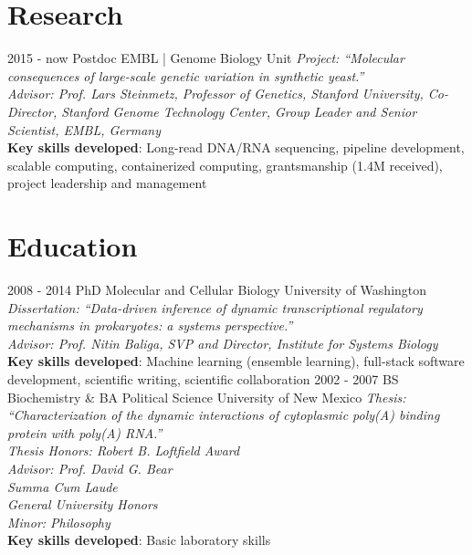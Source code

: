 \documentclass[usenames,dvipsnames]{friggeri-cv}
\begin{document}
\section{Research}
\begin{entrylist}
  \entry
    {2015 - now}
    {Postdoc}
    {EMBL | Genome Biology Unit}
    {\emph{Project: ``Molecular consequences of large-scale genetic variation in synthetic yeast.''}\\
    \emph{Advisor: Prof. Lars Steinmetz, Professor of Genetics, Stanford University, Co-Director, Stanford Genome Technology Center, Group Leader and Senior Scientist, EMBL, Germany}\\
    \textbf{Key skills developed}: Long-read DNA/RNA sequencing, pipeline development, scalable computing, containerized computing, grantsmanship (1.4M received), project leadership and management}
\end{entrylist}

\section{Education}
\begin{entrylist}
  \entry
    {2008 - 2014}
    {PhD Molecular and Cellular Biology}
    {University of Washington}
    {\emph{Dissertation: ``Data-driven inference of dynamic transcriptional regulatory mechanisms in prokaryotes: a systems perspective.''}\\
    \emph{Advisor: Prof. Nitin Baliga, SVP and Director, Institute for Systems Biology}\\
    \textbf{Key skills developed}: Machine learning (ensemble learning), full-stack software development, scientific writing, scientific collaboration}
  \entry
    {2002 - 2007}
    {BS Biochemistry \& BA Political Science}
    {University of New Mexico}
    {\emph{Thesis: ``Characterization of the dynamic interactions of cytoplasmic poly(A) binding protein with poly(A) RNA.''}\\
    \textit{Thesis Honors: Robert B. Loftfield Award}\\
    \emph{Advisor: Prof. David G. Bear}\\
    \textit{Summa Cum Laude}\\
    \textit{General University Honors}\\
    \textit{Minor: Philosophy}\\
    \textbf{Key skills developed}: Basic laboratory skills}
\end{entrylist}
\end{document}
